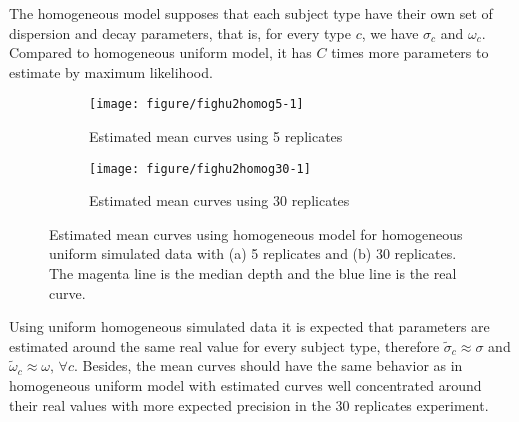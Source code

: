 



The homogeneous model supposes that each subject type have their own  set of dispersion and decay parameters, that is, for every type $c$, we have $\sigma_c$ and $\omega_c$. Compared to homogeneous uniform model, it has $C$ times more parameters to estimate by maximum likelihood.


\begin{figure}[!t]
  \centering
  \begin{subfigure}{\textwidth}
    \centering
\begin{knitrout}
\color{fgcolor}
\texttt{[image: figure/fighu2homog5-1]} 

\end{knitrout}
    \caption{Estimated mean curves using 5 replicates}
  \end{subfigure}
  \begin{subfigure}{\textwidth}
    \centering
\begin{knitrout}
\color{fgcolor}
\texttt{[image: figure/fighu2homog30-1]} 

\end{knitrout}
    \caption{Estimated mean curves using 30 replicates}
  \end{subfigure}
  \caption[Mean curve estimation using homogeneous model for homogeneous uniform simulated data]{Estimated mean curves using homogeneous model for homogeneous uniform simulated data with (a) 5 replicates and (b) 30 replicates. The magenta line is the median depth and the blue line is the real curve.}
  \label{fig:mpchu2homog}
\end{figure}



Using uniform homogeneous simulated data it is expected that parameters are estimated around the same real value for every subject type, therefore $\tilde{\sigma}_c \approx \sigma$ and $\tilde{\omega}_c \approx \omega, \, \forall c$. Besides,  the mean curves should have the same behavior as in homogeneous uniform model with estimated curves well concentrated around their real values with more expected precision in the 30 replicates experiment.

